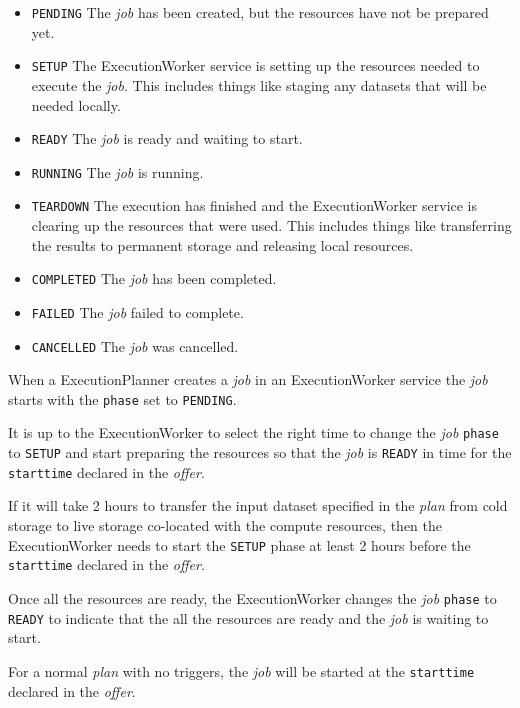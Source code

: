 \documentclass[11pt,a4paper]{ivoa}
\newcommand{\execplanner} {ExecutionPlanner}
\newcommand{\execworker} {ExecutionWorker}
\newcommand{\codeword}[1] {\texttt{#1}}
\newcommand{\dataset} {dataset}
\newcommand{\execplan} {\textit{plan}}
\newcommand{\execoffer} {\textit{offer}}
\newcommand{\workerjob} {\textit{job}}
\begin{document}
\begin{itemize}
    \item \codeword{PENDING}   The \workerjob{} has been created, but the resources have not be prepared yet.
    \item \codeword{SETUP}     The \execworker{} service is setting up the resources needed to execute the \workerjob{}.
                               This includes things like staging any \dataset{}s that will be needed locally.
    \item \codeword{READY}     The \workerjob{} is ready and waiting to start.
    \item \codeword{RUNNING}   The \workerjob{} is running.
    \item \codeword{TEARDOWN}  The execution has finished and the \execworker{} service is clearing up the resources that were used.
                               This includes things like transferring the results to permanent storage and releasing local resources.
    \item \codeword{COMPLETED} The \workerjob{} has been completed.
    \item \codeword{FAILED}    The \workerjob{} failed to complete.
    \item \codeword{CANCELLED} The \workerjob{} was cancelled.
\end{itemize}

When a \execplanner{} creates a \workerjob{} in an \execworker{} service the
\workerjob{} starts with the \codeword{phase} set to \codeword{PENDING}.

It is up to the \execworker{} to select the right time to change the \workerjob{}
\codeword{phase} to \codeword{SETUP} and start preparing the resources so that
the \workerjob{} is \codeword{READY} in time for the \codeword{starttime} declared
in the \execoffer{}.

If it will take 2 hours to transfer the input \dataset{} specified in the \execplan{}
from cold storage to live storage co-located with the compute resources,
then the \execworker{} needs to start the \codeword{SETUP} phase at least 2 hours
before the \codeword{starttime} declared in the \execoffer{}.

Once all the resources are ready, the \execworker{} changes the \workerjob{}
\codeword{phase} to \codeword{READY} to indicate that the all the resources
are ready and the \workerjob{} is waiting to start.

For a normal \execplan{} with no triggers, the \workerjob{} will be started at
the \codeword{starttime} declared in the \execoffer{}.
\end{document}
